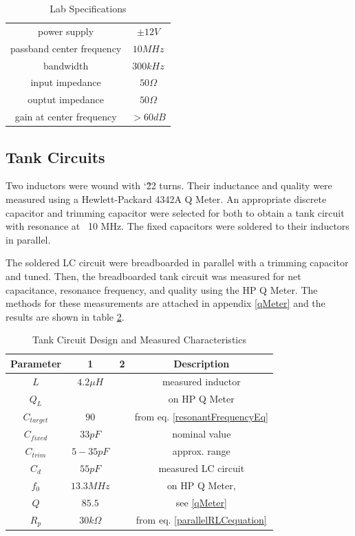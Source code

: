 \documentclass[titlepage, letterpaper, 11pt]{article}
\begin{document}
\begin{table}[ht]
\centering
\caption{Lab Specifications}
\begin{tabular}{c | c}
power supply			&$\pm 12V$	\\
passband center frequency	&$10MHz$	\\
bandwidth			&$300kHz$	\\
input impedance			&$50\Omega$	\\
ouptut impedance		&$50\Omega$	\\
gain at center frequency	&$>60dB$	\\
\end{tabular}
\label{labSpecs}
\end{table}

\subsection{Tank Circuits}

Two inductors were wound with \char`\~22 turns. Their inductance and quality
were measured using a Hewlett-Packard 4342A Q Meter. An appropriate
discrete capacitor and trimming capacitor were selected for both to
obtain a tank circuit with resonance at ~10 MHz. The fixed capacitors
were soldered to their inductors in parallel.

The soldered LC circuit were breadboarded in parallel with a trimming
capacitor and tuned. Then, the breadboarded tank circuit was measured
for net capacitance, resonance frequency, and quality using the HP
Q Meter. The methods for these measurements are attached in appendix
\ref{qMeter} and the results are shown in table
\ref{tankCircuitCharacteristics}.

\begin{table}[ht]
\centering
\caption{Tank Circuit Design and Measured Characteristics}
\begin{tabular}{c|c|c|c}
\hline\hline
Parameter	&1		&2	&Description	\\
\hline\hline
$L$		&$4.2\mu H$	&	&measured inductor	\\
$Q_{L}$		&		&	&on HP Q Meter	\\
\hline
$C_{target}$	&$90$		&	&from eq. \ref{resonantFrequencyEq}	\\
$C_{fixed}$	&$33pF$		&	&nominal value		\\
$C_{trim}$	&$5-35pF$	&	&approx. range		\\
\hline
$C_{d}$		&$55pF$		&	&measured LC circuit	\\
$f_{0}$		&$13.3MHz$	&	&on HP Q Meter,		\\
$Q$		&$85.5$		&	&see \ref{qMeter}	\\
$R_{p}$		&$30k\Omega$	&	&from eq. \ref{parallelRLCequation}	\\
\hline\hline
\end{tabular}
\label{tankCircuitCharacteristics}
\end{table}
\end{document}

